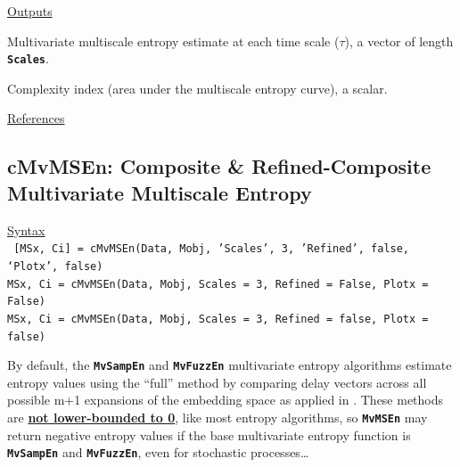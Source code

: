 \documentclass[12pt, a4paper, titlepage, openany]{book}
\begin{document}
\noindent \ul{Outputs}
\begin{description}[labelsep=1cm, labelwidth=2cm, nosep, style=multiline,leftmargin=3cm]\footnotesize
\item[\texttt{MSx}]		Multivariate multiscale entropy estimate at each time scale ($\tau$), a vector of length 											\textbf{\texttt{Scales}}.
\item[\texttt{Ci}]		Complexity index (area under the multiscale entropy curve), a scalar.
\end{description}

\noindent \ul{References}\hspace{1cm}
\cite{MS1} \cite{MS2} \cite{MvSamp1} \cite{MvSamp2}



\newpage
\subsection{\normalsize cMvMSEn: \hspace{10mm} Composite \& Refined-Composite Multivariate Multiscale Entropy} \label{cMvMSEn}
\noindent\ul{Syntax} \vspace{6mm} \\ \noindent \texttt{\footnotesize
[MSx, Ci] = cMvMSEn(Data, Mobj, 'Scales', 3,  'Refined', false, ‘Plotx’, false)\\
MSx, Ci = cMvMSEn(Data, Mobj, Scales = 3, Refined = False, Plotx = False)\\ 
MSx, Ci = cMvMSEn(Data, Mobj, Scales = 3, Refined = false, Plotx = false)}

\begin{tcolorbox}[colback=ehone!5, colframe=ehtwo!, title=\hypertarget{bidinote}{\textbf{ATTENTION}}, label={BiBox}]
By default, the \texttt{\textbf{MvSampEn}} and \texttt{\textbf{MvFuzzEn}} multivariate entropy algorithms estimate entropy values using the “full” method by comparing delay vectors across all possible m+1 expansions of the embedding space as applied in \cite{MvSamp1} \cite{MvSamp2} \cite{MvFuzz1}. These methods are \ul{\textbf{not lower-bounded to 0}}, like most entropy algorithms, so \texttt{\textbf{MvMSEn}} may return negative entropy values if the base multivariate entropy function is \texttt{\textbf{MvSampEn}} and \texttt{\textbf{MvFuzzEn}}, even for stochastic processes…
\end{tcolorbox}
\ \newline
\end{document}
